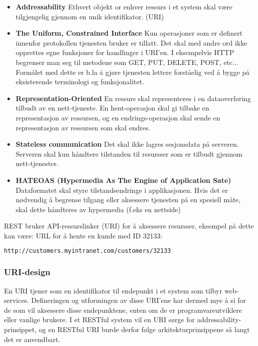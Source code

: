 \documentclass[../main.tex]{subfiles}
\begin{document}
\begin{itemize}
\item \textbf{Addressability} \newline
Ethvert objekt or enhver ressurs i et system skal være tilgjengelig gjennom en unik identifikator. (URI)
\item \textbf{The Uniform, Constrained Interface} \newline
Kun operasjoner som er definert innenfor protokollen tjenesten bruker er tillatt. Det skal med andre ord ikke opprettes egne funksjoner for handlinger i URI’en. I eksempelvis HTTP begrenser man seg til metodene som GET, PUT, DELETE, POST, etc...
Formålet med dette er b.la å gjøre tjenesten lettere forståelig ved å bygge på eksisterende terminologi og funksjonalitet.
\item \textbf{Representation-Oriented} \newline
En ressurs skal representeres i en dataoverføring tilbudt av en nett-tjeneste. En hent-operasjon skal gi tilbake en representasjon av ressursen, og en endrings-operasjon skal sende en representasjon av ressursen som skal endres.
\item \textbf{Stateless communication} \newline
Det skal ikke lagres sesjonsdata på serveren. Serveren skal kun håndtere tilstanden til resursser som er tilbudt gjennom nett-tjenester.
\item \textbf{HATEOAS (Hypermedia As The Engine of Application Sate)} \newline
Dataformatet skal styre tilstandsendringe i applikasjonen. Hvis det er nødvendig å begrense tilgang eller aksessere tjenesten på en spesiell måte, skal dette håndteres av hypermedia (f.eks en nettside)
\end{itemize}
REST bruker API-ressurslinker (URI) for å aksessere resursser, eksempel på dette kan være: URL for å hente en kunde med ID 32133:

\begin{lstlisting}[language=HTML, frame=single]
http://customers.myintranet.com/customers/32133
\end{lstlisting}

\subsubsection{URI-design}

En URI tjener som en identifikator til endepunkt i et system som tilbyr web-services. Defineringen og utformingen av disse URI’ene har dermed mye å si for de som vil aksessere disse endepunktene, enten om de er programvareutviklere eller vanlige brukere. I et RESTful system vil en URI sørge for addressability-prinsippet, og en RESTful URI burde derfor følge arkitekturprinsippene så langt det er anvendbart. 
\end{document}
